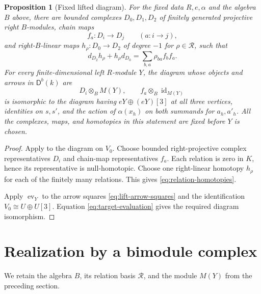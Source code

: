 \documentclass[11pt]{article}
\numberwithin{equation}{section}
\newtheorem{proposition}[theorem]{Proposition}
\theoremstyle{definition}
\theoremstyle{remark}
\newcommand{\D}{\mathsf D}
\DeclareMathOperator{\id}{id}
\begin{document}
\begin{proposition}[Fixed lifted diagram]\label{prop:lifted-diagram}
For the fixed data $R,e,\alpha$ and the algebra $B$ above, there are
bounded complexes $D_0,D_1,D_2$ of finitely generated projective
right $B$-modules, chain maps
\[
  f_a:D_i\longrightarrow D_j\qquad(a:i\to j),
\]
and right-$B$-linear maps $h_\rho:D_0\to D_2$ of degree $-1$
for $\rho\in\mathcal R$, such that
\begin{equation}\label{eq:relation-homotopies}
  d_{D_2}h_\rho+h_\rho d_{D_0}
      =\sum_{b,a}\rho_{ba}f_bf_a.
\end{equation}
For every finite-dimensional left $R$-module $Y$, the diagram
whose objects and arrows in $\D^b(k)$ are
\begin{equation}\label{eq:evaluated-diagram}
  D_i\otimes_B M(Y),\qquad f_a\otimes_B\id_{M(Y)}
\end{equation}
is isomorphic to the diagram having $eY\oplus(eY)[3]$ at all three
vertices, identities on $s,s'$, and the action of $\alpha(x_h)$
on both summands for $a_h,a'_h$.
All the complexes, maps, and homotopies in this statement are fixed
before $Y$ is chosen.
\end{proposition}

\begin{proof}
Apply  to the diagram on $V_0$. Choose bounded
right-projective complex representatives $D_i$ and chain-map
representatives $f_a$.  Each relation is zero in $K$, hence its
representative is null-homotopic.  Choose one right-linear
homotopy $h_\rho$ for each of the finitely many relations.
This gives \eqref{eq:relation-homotopies}.

Apply $\operatorname{ev}_Y$ to the arrow squares \eqref{eq:lift-arrow-squares}
and the identification $V_0\cong U\oplus U[3]$. Equation
\eqref{eq:target-evaluation} gives the required diagram isomorphism.

\end{proof}

\section{Realization by a bimodule complex}
\label{sec:realization}

We retain the algebra \(B\), its relation basis \(\mathcal R\), and the
module \(M(Y)\) from the preceding section.
\end{document}
